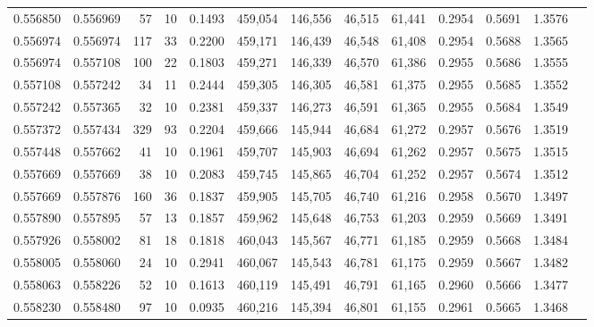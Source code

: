 \begin{tabular}{rrrrrrrrrrrrr}
0.556850 & 0.556969 &    57 &  10 &                                     0.1493 & 459,054 & 146,556 &  46,515 &  61,441 & 0.2954 & 0.5691 & 1.3576 \\
0.556974 & 0.556974 &   117 &  33 &                                     0.2200 & 459,171 & 146,439 &  46,548 &  61,408 & 0.2954 & 0.5688 & 1.3565 \\
0.556974 & 0.557108 &   100 &  22 &                                     0.1803 & 459,271 & 146,339 &  46,570 &  61,386 & 0.2955 & 0.5686 & 1.3555 \\
0.557108 & 0.557242 &    34 &  11 &                                     0.2444 & 459,305 & 146,305 &  46,581 &  61,375 & 0.2955 & 0.5685 & 1.3552 \\
0.557242 & 0.557365 &    32 &  10 &                                     0.2381 & 459,337 & 146,273 &  46,591 &  61,365 & 0.2955 & 0.5684 & 1.3549 \\
0.557372 & 0.557434 &   329 &  93 &                                     0.2204 & 459,666 & 145,944 &  46,684 &  61,272 & 0.2957 & 0.5676 & 1.3519 \\
0.557448 & 0.557662 &    41 &  10 &                                     0.1961 & 459,707 & 145,903 &  46,694 &  61,262 & 0.2957 & 0.5675 & 1.3515 \\
0.557669 & 0.557669 &    38 &  10 &                                     0.2083 & 459,745 & 145,865 &  46,704 &  61,252 & 0.2957 & 0.5674 & 1.3512 \\
0.557669 & 0.557876 &   160 &  36 &                                     0.1837 & 459,905 & 145,705 &  46,740 &  61,216 & 0.2958 & 0.5670 & 1.3497 \\
0.557890 & 0.557895 &    57 &  13 &                                     0.1857 & 459,962 & 145,648 &  46,753 &  61,203 & 0.2959 & 0.5669 & 1.3491 \\
0.557926 & 0.558002 &    81 &  18 &                                     0.1818 & 460,043 & 145,567 &  46,771 &  61,185 & 0.2959 & 0.5668 & 1.3484 \\
0.558005 & 0.558060 &    24 &  10 &                                     0.2941 & 460,067 & 145,543 &  46,781 &  61,175 & 0.2959 & 0.5667 & 1.3482 \\
0.558063 & 0.558226 &    52 &  10 &                                     0.1613 & 460,119 & 145,491 &  46,791 &  61,165 & 0.2960 & 0.5666 & 1.3477 \\
0.558230 & 0.558480 &    97 &  10 &                                     0.0935 & 460,216 & 145,394 &  46,801 &  61,155 & 0.2961 & 0.5665 & 1.3468 \\

\end{tabular}
